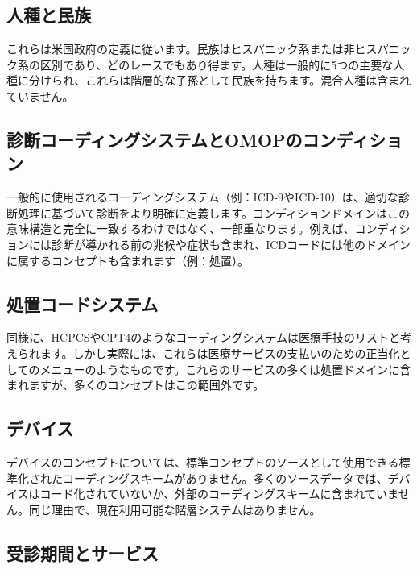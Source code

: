 \documentclass[
  11pt]{book}
\theoremstyle{definition}
\theoremstyle{definition}
\theoremstyle{definition}
\theoremstyle{definition}
\theoremstyle{remark}
\begin{document}
\subsection{人種と民族}\label{ux4ebaux7a2eux3068ux6c11ux65cf}

これらは米国政府の定義に従います。民族はヒスパニック系または非ヒスパニック系の区別であり、どのレースでもあり得ます。人種は一般的に5つの主要な人種に分けられ、これらは階層的な子孫として民族を持ちます。混合人種は含まれていません。

\subsection{診断コーディングシステムとOMOPのコンディション}\label{ux8a3aux65adux30b3ux30fcux30c7ux30a3ux30f3ux30b0ux30b7ux30b9ux30c6ux30e0ux3068omopux306eux30b3ux30f3ux30c7ux30a3ux30b7ux30e7ux30f3}

一般的に使用されるコーディングシステム（例：ICD-9やICD-10）は、適切な診断処理に基づいて診断をより明確に定義します。コンディションドメインはこの意味構造と完全に一致するわけではなく、一部重なります。例えば、コンディションには診断が導かれる前の兆候や症状も含まれ、ICDコードには他のドメインに属するコンセプトも含まれます（例：処置）。

\subsection{処置コードシステム}\label{ux51e6ux7f6eux30b3ux30fcux30c9ux30b7ux30b9ux30c6ux30e0}

同様に、HCPCSやCPT4のようなコーディングシステムは医療手技のリストと考えられます。しかし実際には、これらは医療サービスの支払いのための正当化としてのメニューのようなものです。これらのサービスの多くは処置ドメインに含まれますが、多くのコンセプトはこの範囲外です。

\subsection{デバイス}\label{ux30c7ux30d0ux30a4ux30b9}

デバイスのコンセプトについては、標準コンセプトのソースとして使用できる標準化されたコーディングスキームがありません。多くのソースデータでは、デバイスはコード化されていないか、外部のコーディングスキームに含まれていません。同じ理由で、現在利用可能な階層システムはありません。

\subsection{受診期間とサービス}\label{ux53d7ux8a3aux671fux9593ux3068ux30b5ux30fcux30d3ux30b9}
\end{document}

